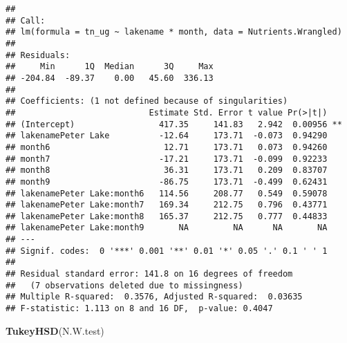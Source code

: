 \documentclass[]{article}
\newenvironment{Shaded}{\begin{snugshade}}{\end{snugshade}}
\newcommand{\KeywordTok}[1]{\textcolor[rgb]{0.13,0.29,0.53}{\textbf{#1}}}
\newcommand{\NormalTok}[1]{#1}
\begin{document}
\begin{verbatim}
## 
## Call:
## lm(formula = tn_ug ~ lakename * month, data = Nutrients.Wrangled)
## 
## Residuals:
##     Min      1Q  Median      3Q     Max 
## -204.84  -89.37    0.00   45.60  336.13 
## 
## Coefficients: (1 not defined because of singularities)
##                           Estimate Std. Error t value Pr(>|t|)   
## (Intercept)                 417.35     141.83   2.942  0.00956 **
## lakenamePeter Lake          -12.64     173.71  -0.073  0.94290   
## month6                       12.71     173.71   0.073  0.94260   
## month7                      -17.21     173.71  -0.099  0.92233   
## month8                       36.31     173.71   0.209  0.83707   
## month9                      -86.75     173.71  -0.499  0.62431   
## lakenamePeter Lake:month6   114.56     208.77   0.549  0.59078   
## lakenamePeter Lake:month7   169.34     212.75   0.796  0.43771   
## lakenamePeter Lake:month8   165.37     212.75   0.777  0.44833   
## lakenamePeter Lake:month9       NA         NA      NA       NA   
## ---
## Signif. codes:  0 '***' 0.001 '**' 0.01 '*' 0.05 '.' 0.1 ' ' 1
## 
## Residual standard error: 141.8 on 16 degrees of freedom
##   (7 observations deleted due to missingness)
## Multiple R-squared:  0.3576, Adjusted R-squared:  0.03635 
## F-statistic: 1.113 on 8 and 16 DF,  p-value: 0.4047
\end{verbatim}

\begin{Shaded}
\begin{Highlighting}[]
\KeywordTok{TukeyHSD}\NormalTok{(N.W.test)}
\end{Highlighting}
\end{Shaded}
\end{document}
